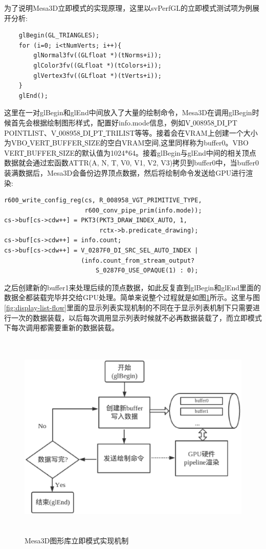 为了说明Mesa3D立即模式的实现原理，这里以svPerfGL的立即模式测试项为例展开分析:

\begin{lstlisting}
	glBegin(GL_TRIANGLES);
	for (i=0; i<tNumVerts; i++){
		glNormal3fv((GLfloat *)(tNorms+i));
		glColor3fv((GLfloat *)(tColors+i));
	    glVertex3fv((GLfloat *)(tVerts+i));
	}
	glEnd();
\end{lstlisting}

这里在一对glBegin和glEnd中间放入了大量的绘制命令，Mesa3D在调用glBegin时候首先会根据绘制图形样式，配置好info.mode信息，例如V\underline{ }008958\underline{ }DI\underline{ }PT\underline{ }POINTLIST、V\underline{ }008958\underline{ }DI\underline{ }PT\underline{ }TRILIST等等。接着会在VRAM上创建一个大小为VBO\underline{ }VERT\underline{ }BUFFER\underline{ }SIZE的空白VRAM空间,这里同样称为buffer0。VBO\underline{ }VERT\underline{ }BUFFER\underline{ }SIZE的默认值为1024*64。接着glBegin与glEnd中间的相关顶点数据就会通过宏函数ATTR(A, N, T, V0, V1, V2, V3)拷贝到buffer0中，当buffer0装满数据后，Mesa3D会备份边界顶点数据，然后将绘制命令发送给GPU进行渲染:

\begin{lstlisting}
r600_write_config_reg(cs, R_008958_VGT_PRIMITIVE_TYPE,
                      r600_conv_pipe_prim(info.mode));
cs->buf[cs->cdw++] = PKT3(PKT3_DRAW_INDEX_AUTO, 1, 
                          rctx->b.predicate_drawing);
cs->buf[cs->cdw++] = info.count;
cs->buf[cs->cdw++] = V_0287F0_DI_SRC_SEL_AUTO_INDEX |
                     (info.count_from_stream_output? 
                         S_0287F0_USE_OPAQUE(1) : 0);
\end{lstlisting}

之后创建新的buffer1来处理后续的顶点数据，如此反复直到glBegin和glEnd里面的数据全都装载完毕并交给GPU处理。简单来说整个过程就是如图\ref{fig:immediate-mode-flow}所示。这里与图\ref{fig:display-list-flow}里面的显示列表实现机制的不同在于显示列表机制下只需要进行一次的数据装载，以后每次调用显示列表时候就不必再数据装载了，而立即模式下每次调用都需要重新的数据装载。

\begin{figure}[H] 
  \centering
  \includegraphics[width=14cm,height=10cm]{figures/chap03/immediate-mode-flow}
  \caption{Mesa3D图形库立即模式实现机制}
  \label{fig:immediate-mode-flow}
\end{figure}

